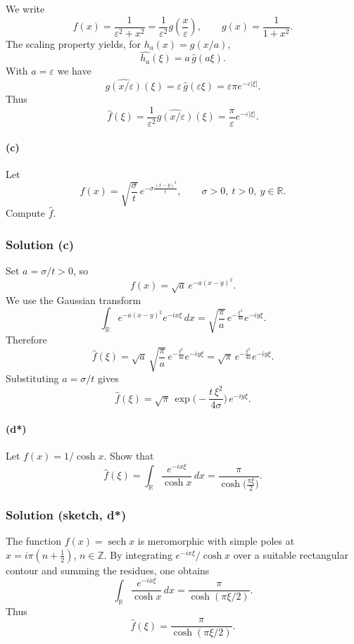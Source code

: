 \documentclass[12pt,a4paper]{article}
\theoremstyle{plain}
\theoremstyle{definition}
\theoremstyle{remark}
\DeclareMathOperator{\sech}{sech}
\theoremstyle{remark}
\begin{document}
We write
\[
f(x) = \frac{1}{\varepsilon^2 + x^2}
= \frac{1}{\varepsilon^2} g\!\left(\frac{x}{\varepsilon}\right),
\qquad
g(x)=\frac{1}{1+x^2}.
\]
The scaling property yields, for $h_a(x)=g(x/a)$,
\[
\widehat{h_a}(\xi) = a\,\widehat{g}(a\xi).
\]
With $a=\varepsilon$ we have
\[
\widehat{g(x/\varepsilon)}(\xi)
= \varepsilon\,\widehat{g}(\varepsilon\xi)
= \varepsilon\pi e^{-\varepsilon|\xi|}.
\]
Thus
\[
\widehat{f}(\xi)
= \frac{1}{\varepsilon^2}
\widehat{g(x/\varepsilon)}(\xi)
= \frac{\pi}{\varepsilon} e^{-\varepsilon|\xi|}.
\]

\paragraph{(c)}
Let
\[
f(x)=\sqrt{\frac{\sigma}{t}}\,
e^{-\sigma\frac{(x-y)^2}{t}},\qquad \sigma>0,\ t>0,\ y\in\mathbb{R}.
\]
Compute $\widehat{f}$.

\subsubsection*{Solution (c)}

Set $a=\sigma/t>0$, so
\[
f(x) = \sqrt{a}\,e^{-a(x-y)^2}.
\]
We use the Gaussian transform
\[
\int_{\mathbb{R}} e^{-a(x-y)^2} e^{-i x\xi}\,dx
= \sqrt{\frac{\pi}{a}}\,e^{-\frac{\xi^2}{4a}}e^{-i y\xi}.
\]
Therefore
\[
\widehat{f}(\xi)
= \sqrt{a}\,\sqrt{\frac{\pi}{a}}\,e^{-\frac{\xi^2}{4a}}e^{-i y\xi}
= \sqrt{\pi}\,e^{-\frac{\xi^2}{4a}}e^{-i y\xi}.
\]
Substituting $a=\sigma/t$ gives
\[
\widehat{f}(\xi)
= \sqrt{\pi}\,\exp\!\Big(-\frac{t\,\xi^2}{4\sigma}\Big)\,e^{-i y\xi}.
\]

\paragraph{(d*)}
Let $f(x)=1/\cosh x$. Show that
\[
\widehat{f}(\xi) = \int_{\mathbb{R}} \frac{e^{-i x\xi}}{\cosh x}\,dx
= \frac{\pi}{\cosh\!\big(\frac{\pi\xi}{2}\big)}.
\]

\subsubsection*{Solution (sketch, d*)}

The function $f(x)=\sech x$ is meromorphic with simple poles at
$x=i\pi(n+\tfrac12)$, $n\in\mathbb{Z}$. By integrating
$e^{-i x\xi}/\cosh x$ over a suitable rectangular contour and summing
the residues, one obtains
\[
\int_{\mathbb{R}}\frac{e^{-i x\xi}}{\cosh x}\,dx
= \frac{\pi}{\cosh(\pi\xi/2)}.
\]
Thus
\[
\widehat{f}(\xi) = \frac{\pi}{\cosh(\pi\xi/2)}.
\]
\end{document}
